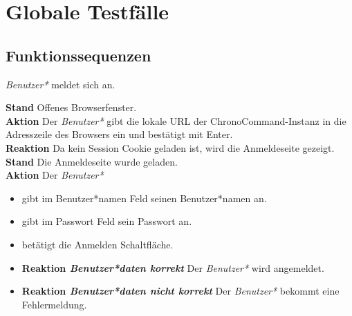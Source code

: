 \section{Globale Testfälle}

\subsection{Funktionssequenzen}
\begin{requirements}
	 \emph{Benutzer*} meldet sich an.
	\begin{requirements}
  			    \textbf{Stand} Offenes Browserfenster. \\
  			    \textbf{Aktion} Der \emph{Benutzer*} gibt die lokale URL der ChronoCommand-Instanz in die Adresszeile des Browsers ein und bestätigt mit Enter. \\
  			    \textbf{Reaktion} Da kein Session Cookie geladen ist, wird die Anmeldeseite gezeigt.
  			    \textbf{Stand} Die Anmeldeseite wurde geladen.\\
                \textbf{Aktion} Der \emph{Benutzer*}
                    \begin{itemize}
                        \item gibt im Benutzer*namen Feld seinen Benutzer*namen an.
                        \item gibt im Passwort Feld sein Passwort an.
                        \item betätigt die Anmelden Schaltfläche.
                    \end{itemize}
                \begin{itemize}
			\item \textbf{Reaktion \emph{Benutzer*daten korrekt}} Der \emph{Benutzer*} wird angemeldet.
			\item \textbf{Reaktion \emph{Benutzer*daten nicht korrekt}} Der \emph{Benutzer*} bekommt eine Fehlermeldung.
                \end{itemize}


\end{requirements}
\end{requirements}
